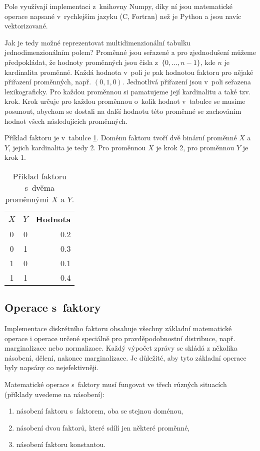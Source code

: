 Pole využívají implementaci z~knihovny Numpy, díky ní jsou matematické operace napsané v~rychlejším jazyku (C, Fortran) než je Python a jsou navíc vektorizované.

Jak je tedy možné reprezentovat multidimenzionální tabulku jednodimenzionálním polem?
Proměnné jsou seřazené a pro zjednodušení můžeme předpokládat, že hodnoty proměnných jsou čísla z~$\{0, \dots, n-1\}$, kde $n$ je kardinalita proměnné.
Každá hodnota v~poli je pak hodnotou faktoru pro nějaké přiřazení proměnných, např. $(0, 1, 0)$.
Jednotlivá přiřazení jsou v~poli seřazena lexikograficky.
Pro každou proměnnou si pamatujeme její kardinalitu a také tzv. krok.
Krok určuje pro každou proměnnou o~kolik hodnot v~tabulce se musíme posunout, abychom se dostali na další hodnotu této proměnné se zachováním hodnot všech následujících proměnných.

Příklad faktoru je v~tabulce \ref{tab:stride}.
Doménu faktoru tvoří dvě binární proměnné $X$ a $Y$, jejich kardinalita je tedy 2.
Pro proměnnou $X$ je krok 2, pro proměnnou $Y$ je krok 1.

\begin{table}
\begin{center}
\begin{tabular}{|c|c|r|}
\hline
$X$ & $Y$ & Hodnota \\
\hline
\hline
0 & 0 & 0.2 \\
\hline
0 & 1 & 0.3 \\
\hline
1 & 0 & 0.1 \\
\hline
1 & 1 & 0.4 \\
\hline
\end{tabular}
\end{center}
\caption{Příklad faktoru s~dvěma proměnnými $X$ a $Y$.}
\label{tab:stride}
\end{table}

\subsection{Operace s~faktory}

Implementace diskrétního faktoru obsahuje všechny základní matematické operace i operace určené speciálně pro pravděpodobnostní distribuce, např. marginalizace nebo normalizace.
Každý výpočet zprávy se skládá z několika násobení, dělení, nakonec marginalizace.
Je důležité, aby tyto základní operace byly napsány co nejefektivněji.

Matematické operace s~faktory musí fungovat ve třech různých situacích (příklady uvedeme na násobení):
\begin{enumerate}
    \item násobení faktoru s~faktorem, oba se stejnou doménou,
    \item násobení dvou faktorů, které sdílí jen některé proměnné,
    \item násobení faktoru konstantou.
\end{enumerate}

